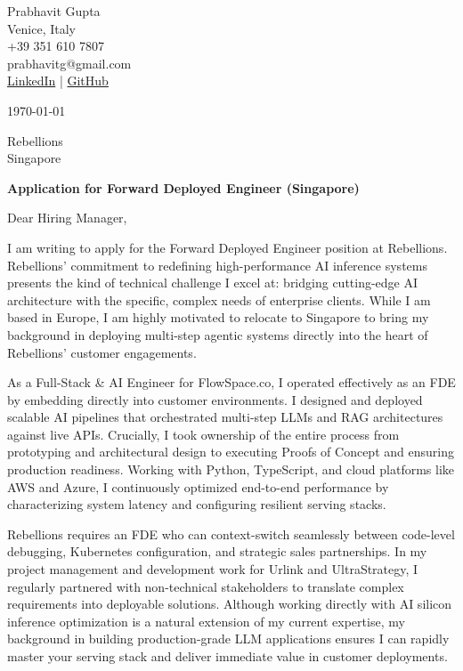 \documentclass[11pt,a4paper]{article}
\begin{document}
\begin{flushleft}
Prabhavit Gupta\\
Venice, Italy\\
+39 351 610 7807\\
prabhavitg@gmail.com\\
\href{https://www.linkedin.com/in/prabhavit/}{LinkedIn} | \href{https://github.com/prab-gupta}{GitHub}
\end{flushleft}

\vspace{1em}

\noindent \today

\vspace{1em}

\noindent Rebellions\\
Singapore

\vspace{1em}

\noindent \textbf{Application for Forward Deployed Engineer (Singapore)}

\vspace{1em}

\noindent Dear Hiring Manager,

\vspace{1em}

\noindent I am writing to apply for the Forward Deployed Engineer position at Rebellions. Rebellions' commitment to redefining high-performance AI inference systems presents the kind of technical challenge I excel at: bridging cutting-edge AI architecture with the specific, complex needs of enterprise clients. While I am based in Europe, I am highly motivated to relocate to Singapore to bring my background in deploying multi-step agentic systems directly into the heart of Rebellions' customer engagements.

\noindent As a Full-Stack \& AI Engineer for FlowSpace.co, I operated effectively as an FDE by embedding directly into customer environments. I designed and deployed scalable AI pipelines that orchestrated multi-step LLMs and RAG architectures against live APIs. Crucially, I took ownership of the entire process from prototyping and architectural design to executing Proofs of Concept and ensuring production readiness. Working with Python, TypeScript, and cloud platforms like AWS and Azure, I continuously optimized end-to-end performance by characterizing system latency and configuring resilient serving stacks. 

\noindent Rebellions requires an FDE who can context-switch seamlessly between code-level debugging, Kubernetes configuration, and strategic sales partnerships. In my project management and development work for Urlink and UltraStrategy, I regularly partnered with non-technical stakeholders to translate complex requirements into deployable solutions. Although working directly with AI silicon inference optimization is a natural extension of my current expertise, my background in building production-grade LLM applications ensures I can rapidly master your serving stack and deliver immediate value in customer deployments. 
\end{document}
